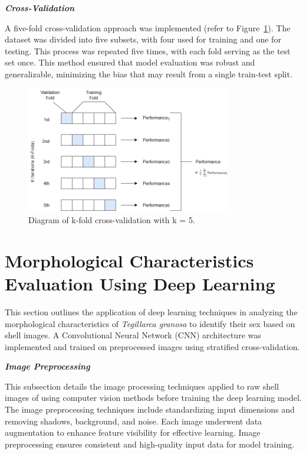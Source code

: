 \textbf{\textit{Cross-Validation}}

A five-fold cross-validation approach was implemented (refer to Figure~\ref{fig:cv}). The dataset was divided into five subsets, with four used for training and one for testing. This process was repeated five times, with each fold serving as the test set once. This method ensured that model evaluation was robust and generalizable, minimizing the bias that may result from a single train-test split. \cite{geeksforgeeks2024}

\begin{figure}[!htbp]
	\centering
	\includegraphics[width=0.8\textwidth]{figures/cv.png}
	\caption{Diagram of k-fold cross-validation with k = 5.}
	\label{fig:cv}
\end{figure}

\section{Morphological Characteristics Evaluation Using Deep Learning}
This section outlines the application of deep learning techniques in analyzing the morphological characteristics of \textit{Tegillarca granosa} to identify their sex based on shell images. A Convolutional Neural Network (CNN) architecture was implemented and trained on preprocessed images using stratified cross-validation.

\textbf{\textit{Image Preprocessing}}

This subsection details the image processing techniques applied to raw shell images of \Tgranosa using computer vision methods before training the deep learning model. The image preprocessing techniques include standardizing input dimensions and removing shadows, background, and noise. Each image underwent data augmentation to enhance feature visibility for effective learning. Image preprocessing ensures consistent and high-quality input data for model training.

